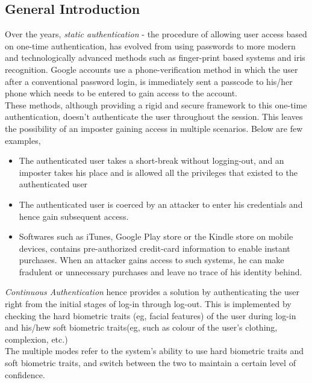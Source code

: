 \documentclass[12pt]{article}			%
\begin{document}

\subsection{ General Introduction }
Over the years, \emph{static authentication} - the procedure of allowing user access based on one-time authentication, has evolved from using passwords to more modern and technologically advanced methods such as finger-print based systems and iris recognition. Google accounts use a phone-verification method in which the user after a conventional password login, is immediately sent a passcode to his/her phone which needs to be entered to gain access to the account.\\
These methods, although providing a rigid and secure framework to this one-time authentication, doesn't authenticate the user throughout the session. This leaves the possibility of an imposter gaining access in multiple scenarios. Below are few examples,
\begin{itemize}
\item The authenticated user takes a short-break without logging-out, and an imposter takes his place  and is allowed all the privileges that existed to the authenticated user
\item The authenticated user is coerced by an attacker to enter his credentials and hence gain subsequent access.
\item Softwares such as iTunes, Google Play store or the Kindle store on mobile devices, contains pre-authorized credit-card information to enable instant purchases. When an attacker gains access to such systems, he can make fradulent or unnecessary purchases and leave no trace of his identity behind.
\end{itemize}
\emph{Continuous Authentication} hence provides a solution by authenticating the user right from the initial stages of log-in through log-out. This is implemented by checking the hard biometric traits (eg, facial features) of the user during log-in and his/hew soft biometric traits\cite{Niin10}(eg, such as colour of the user's clothing, complexion, etc.)\\
The multiple modes refer to the system's ability to use hard biometric traits and soft biometric traits, and switch between the two to maintain a certain level of confidence. 
\end{document}

